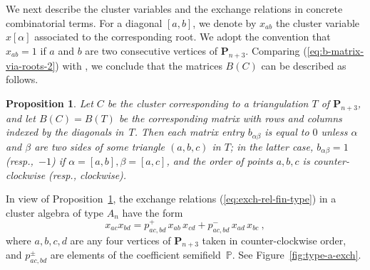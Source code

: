 \documentclass[letterpaper]{amsart}
\numberwithin{equation}{section}
\newtheorem{proposition}[theorem]{Proposition}
\theoremstyle{definition}
\def\AA{\mathcal{A}}
\def\PP{\mathbb{P}}
\def\Poly{\mathbf{P}}
\begin{document}
We next describe the cluster variables and the exchange relations in 
concrete combinatorial terms. 
For a diagonal $[a,b]$, we denote by $x_{ab}$ the cluster variable 
$x[\alpha]$ associated to the corresponding root. 
We adopt the convention that $x_{ab} = 1$ if $a$ and $b$ are two 
consecutive vertices of $\Poly_{n+3}$. 
Comparing (\ref{eq:b-matrix-via-roots-2}) 
with \cite[Lemma~4.2]{cfz}, we conclude that 
the matrices $B(C)$ can be described as follows. 
 
\begin{proposition} 
\label{pr:exchanges-A-1} 
Let $C$ be the cluster corresponding to  a triangulation $T$ of $\Poly_{n+3}$, 
and let $B(C) = B(T)$ be the corresponding matrix 
with rows and columns indexed by the diagonals in~$T$. 
Then each matrix entry $b_{\alpha \beta}$ is equal to $0$ 
unless $\alpha$ and $\beta$ are two sides of some triangle 
$(a,b,c)$ in $T$; in the latter case, $b_{\alpha \beta} = 1$ 
(resp.,~$-1$) if $\alpha = [a,b], \beta = [a,c]$, and the order of 
points $a,b,c$ is counter-clockwise (resp., clockwise). 
\end{proposition} 
 
In view of Proposition~\ref{pr:exchanges-A-1}, 
the exchange relations (\ref{eq:exch-rel-fin-type}) in a cluster 
algebra of type $A_n$ have the form 
\begin{equation} 
\label{eq:exchange-relation-A} 
x_{ac} x_{bd} = p^+_{ac,bd}\, x_{ab}\, x_{cd} 
+ p^-_{ac,bd}\, x_{ad}\, x_{bc} \ , 
\end{equation} 
where $a,b,c,d$ are any four vertices of $\Poly_{n+3}$ taken in 
counter-clockwise order, and 
$p^\pm_{ac,bd}$ 
are elements of the coefficient semifield~$\PP$. 
See Figure~\ref{fig:type-a-exch}. 
 
 
\end{document}
